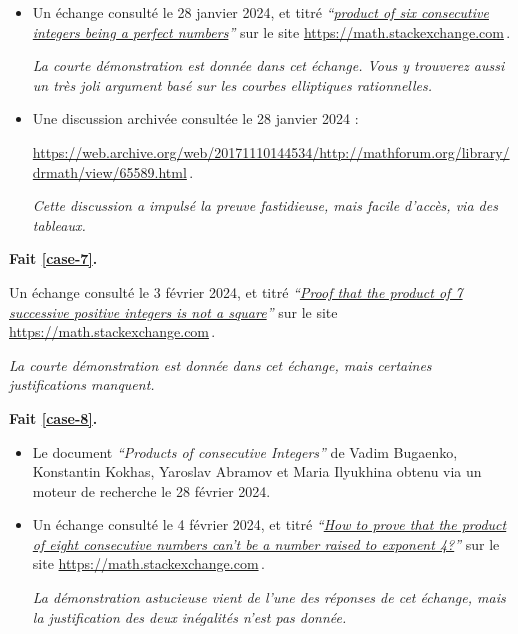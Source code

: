 \begin{itemize}
	\item Un échange consulté le 28 janvier 2024, et titré
\emph{\enquote{\href{https://math.stackexchange.com/q/90894/52365}{product of six consecutive integers being a perfect numbers}}} 
sur le site \url{https://math.stackexchange.com}\,.
	
	\smallskip
	\noindent
	\emph{La courte démonstration est donnée dans cet échange. Vous y trouverez aussi un très joli argument basé sur les courbes elliptiques rationnelles.}


	\item Une discussion archivée consultée le 28 janvier 2024 : 
	
	\noindent
	\url{https://web.archive.org/web/20171110144534/http://mathforum.org/library/drmath/view/65589.html}\,.
	
	\smallskip
	\noindent
	\emph{Cette discussion a impulsé la preuve fastidieuse, mais facile d'accès, via des tableaux.}
\end{itemize}
\vspace{-1ex}




\bigskip
\textbf{Fait \ref{case-7}.}
	
\smallskip
\noindent
Un échange consulté le 3 février 2024, et titré
\emph{\enquote{\href{https://math.stackexchange.com/q/2334887/52365}{Proof that the product of 7 successive positive integers is not a square}}} 
sur le site \url{https://math.stackexchange.com}\,.
	
\smallskip
\noindent
\emph{La courte démonstration est donnée dans cet échange, mais certaines justifications manquent.}




\bigskip
\textbf{Fait \ref{case-8}.}
	
\begin{itemize}
	\item Le document \emph{\enquote{Products of consecutive Integers}} de Vadim Bugaenko, Konstantin Kokhas, Yaroslav Abramov et Maria Ilyukhina obtenu via un moteur de recherche le 28 février 2024.


	\item Un échange consulté le 4 février 2024, et titré \emph{\enquote{\href{https://math.stackexchange.com/a/2271715/52365}{How to prove that the product of eight consecutive numbers can't be a number raised to exponent 4?}}} sur le site \url{https://math.stackexchange.com}\,.

    \smallskip
    \noindent
    \emph{La démonstration astucieuse vient de l'une des réponses de cet échange, mais la justification des deux inégalités n'est pas donnée.}
\end{itemize}
\vspace{-1ex}






